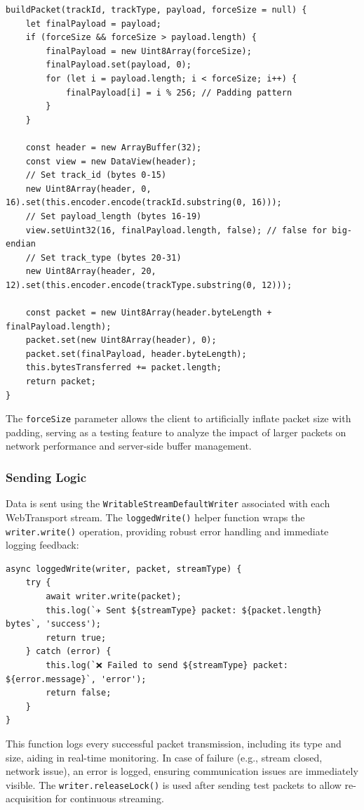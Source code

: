 \begin{lstlisting}
buildPacket(trackId, trackType, payload, forceSize = null) {
    let finalPayload = payload;
    if (forceSize && forceSize > payload.length) {
        finalPayload = new Uint8Array(forceSize);
        finalPayload.set(payload, 0);
        for (let i = payload.length; i < forceSize; i++) {
            finalPayload[i] = i % 256; // Padding pattern
        }
    }

    const header = new ArrayBuffer(32);
    const view = new DataView(header);
    // Set track_id (bytes 0-15)
    new Uint8Array(header, 0, 16).set(this.encoder.encode(trackId.substring(0, 16)));
    // Set payload_length (bytes 16-19)
    view.setUint32(16, finalPayload.length, false); // false for big-endian
    // Set track_type (bytes 20-31)
    new Uint8Array(header, 20, 12).set(this.encoder.encode(trackType.substring(0, 12)));

    const packet = new Uint8Array(header.byteLength + finalPayload.length);
    packet.set(new Uint8Array(header), 0);
    packet.set(finalPayload, header.byteLength);
    this.bytesTransferred += packet.length;
    return packet;
}
\end{lstlisting}

The \texttt{forceSize} parameter allows the client to artificially inflate packet size with padding, serving as a testing feature to analyze the impact of larger packets on network performance and server-side buffer management.

\subsubsection{Sending Logic}
Data is sent using the \texttt{WritableStreamDefaultWriter} associated with each WebTransport stream. The \texttt{loggedWrite()} helper function wraps the \texttt{writer.write()} operation, providing robust error handling and immediate logging feedback:

\begin{lstlisting}
async loggedWrite(writer, packet, streamType) {
    try {
        await writer.write(packet);
        this.log(`✈️ Sent ${streamType} packet: ${packet.length} bytes`, 'success');
        return true;
    } catch (error) {
        this.log(`❌ Failed to send ${streamType} packet: ${error.message}`, 'error');
        return false;
    }
}
\end{lstlisting}

This function logs every successful packet transmission, including its type and size, aiding in real-time monitoring. In case of failure (e.g., stream closed, network issue), an error is logged, ensuring communication issues are immediately visible. The \texttt{writer.releaseLock()} is used after sending test packets to allow re-acquisition for continuous streaming.

